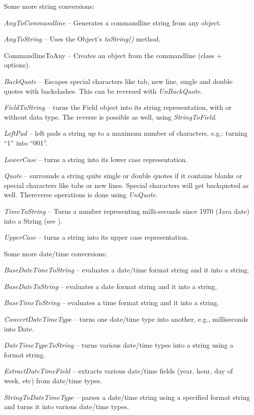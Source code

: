 Some more string conversions:
\begin{tight_itemize}
	\item \textit{AnyToCommandline} -- Generates a commandline string from any
	object.
	\item \textit{AnyToString} -- Uses the Object's \textit{toString()} method.
	\item CommandlineToAny -- Creates an object from the commandline (class +
	options).
	\item \textit{BackQuote} -- Escapes special characters like tab, new line, 
	single and double quotes with backslashes. This can be reversed with 
	\textit{UnBackQuote}.
	\item \textit{FieldToString} -- turns the Field object into its string
	representation, with or without data type. The reverse is possible as well,
	using \textit{StringToField}.
	\item \textit{LeftPad} -- left pads a string up to a maximum number of
	characters, e.g.: turning ``1'' into ``001''.
	\item \textit{LowerCase} -- turns a string into its lower case representation.
	\item \textit{Quote} -- surrounds a string quite single or double quotes
	if it contains blanks or special characters like tabs or new lines. Special
	characters will get backquoted as well. Thereverse operations is done 
	using \textit{UnQuote}.
	\item \textit{TimeToString} -- Turns a number representing milli-seconds since
	1970 (Java date) into a String (see \cite{dateformat}).
	\item \textit{UpperCase} -- turns a string into its upper case representation.
\end{tight_itemize}
Some more date/time conversions:
\begin{tight_itemize}
	\item \textit{BaseDateTimeToString} -- evaluates a date/time format string 
	and it into a string.
	\item \textit{BaseDateToString} -- evaluates a date format string 
	and it into a string.
	\item \textit{BaseTimeToString} -- evaluates a time format string 
	and it into a string.
	\item \textit{ConvertDateTimeType} -- turns one date/time type into another,
	e.g., milliseconds into Date.
	\item \textit{DateTimeTypeToString} -- turns various date/time types into a 
	string using a format string.
	\item \textit{ExtractDateTimeField} -- extracts various date/time fields 
	(year, hour, day of week, etc) from date/time types.
	\item \textit{StringToDateTimeType} -- parses a date/time string using a 
	specified format string and turns it into various date/time types.
\end{tight_itemize}

